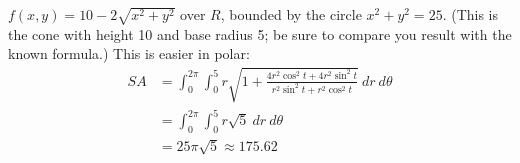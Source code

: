 {$f(x,y) = 10-2\sqrt{x^2+y^2}$ over $R$, bounded by the circle $x^2+y^2=25$. (This is the cone with height 10 and base radius 5; be sure to compare you result with the known formula.)
}
{This is easier in polar:
\begin{align*}SA &= \int_{0}^{2\pi}\int_{0}^{5} r\sqrt{1+ \frac{4r^2\cos^2t+4r^2\sin^2t}{r^2\sin^2t+r^2\cos^2t}}\ dr\ d\theta\\
		&= \int_0^{2\pi}\int_0^5r\sqrt{5}\ dr\ d\theta \\
		&= 25\pi\sqrt{5}\approx 175.62
\end{align*}
}